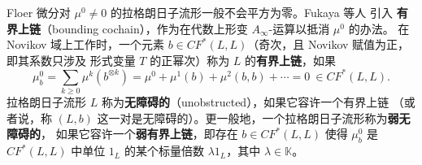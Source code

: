 \documentclass[UTF8,a4paper,11pt,fontset=windows]{ctexart}
\theoremstyle{cnthm}
\numberwithin{equation}{section}
\newcommand{\KK}{\mathbb{K}}          %
\newcommand{\CF}{CF}                  %
\begin{document}

Floer 微分对 $\mu^{0}\neq0$ 的拉格朗日子流形一般不会平方为零。Fukaya 等人 \cite{r44} 引入
\textbf{有界上链}（bounding cochain），作为在代数上形变 $A_\infty$-运算以抵消 $\mu^{0}$ 的办法。
在 Novikov 域上工作时，一个元素 $b\in\CF^{*}(L,L)$（奇次，且 Novikov 赋值为正，即其系数只涉及
形式变量 $T$ 的正幂次）称为 $L$ 的\textbf{有界上链}，如果
\[
\mu^{0}_{b}=\sum_{k\ge0}\mu^{k}(b^{\otimes k})
=\mu^{0}+\mu^{1}(b)+\mu^{2}(b,b)+\cdots=0\ \in\CF^{*}(L,L).
\]
拉格朗日子流形 $L$ 称为\textbf{无障碍的}（unobstructed），如果它容许一个有界上链
（或者说，称 $(L,b)$ 这一对是无障碍的）。更一般地，一个拉格朗日子流形称为\textbf{弱无障碍的}，
如果它容许一个\textbf{弱有界上链}，即存在 $b\in\CF^{*}(L,L)$ 使得 $\mu^{0}_{b}$ 是
$\CF^{*}(L,L)$ 中单位 $1_L$ 的某个标量倍数 $\lambda 1_L$，其中 $\lambda\in\KK$。

\end{document}

